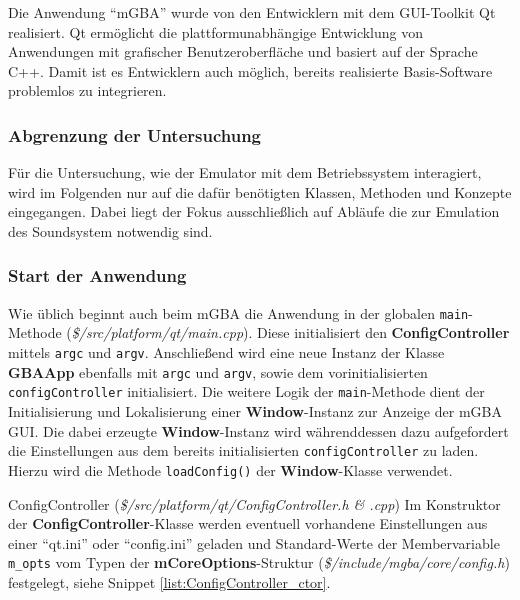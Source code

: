 \documentclass[11pt,a4paper]{scrartcl}
\begin{document}
Die Anwendung \enquote{mGBA} wurde von den Entwicklern mit dem GUI-Toolkit Qt realisiert. Qt erm\"oglicht die plattformunabh\"angige Entwicklung von Anwendungen mit grafischer Benutzeroberfl\"ache und basiert auf der Sprache C++. Damit ist es Entwicklern auch m\"oglich, bereits realisierte Basis-Software problemlos zu integrieren.

\subsubsection{Abgrenzung der Untersuchung}

F\"ur die Untersuchung, wie der Emulator mit dem Betriebssystem interagiert, wird im Folgenden nur auf die daf\"ur ben\"otigten Klassen, Methoden und Konzepte eingegangen. Dabei liegt der Fokus ausschlie{\ss}lich auf Abl\"aufe die zur Emulation des Soundsystem notwendig sind.

\subsubsection{Start der Anwendung}

Wie \"ublich beginnt auch beim mGBA die Anwendung in der globalen \verb|main|-Methode (\textit{\$/src/platform/qt/main.cpp}). Diese initialisiert den \textbf{ConfigController} mittels \verb|argc| und \verb|argv|. Anschlie{\ss}end wird eine neue Instanz der Klasse \textbf{GBAApp} ebenfalls mit \verb|argc| und \verb|argv|, sowie dem vorinitialisierten \verb|configController| initialisiert. Die weitere Logik der \verb|main|-Methode dient der Initialisierung und Lokalisierung einer \textbf{Window}-Instanz zur Anzeige der mGBA GUI. Die dabei erzeugte \textbf{Window}-Instanz wird w\"ahrenddessen dazu aufgefordert die Einstellungen aus dem bereits initialisierten \verb|configController| zu laden. Hierzu wird die Methode \verb|loadConfig()| der \textbf{Window}-Klasse verwendet.

\vspace{5mm}
\large ConfigController \normalsize(\textit{\$/src/platform/qt/ConfigController.h \& .cpp})
\vspace{2mm}\newline
Im Konstruktor der \textbf{ConfigController}-Klasse werden eventuell vorhandene Einstellungen aus einer \enquote{qt.ini} oder \enquote{config.ini} geladen und Standard-Werte der Membervariable \verb|m_opts| vom Typen der \textbf{mCoreOptions}-Struktur (\textit{\$/include/mgba/core/config.h}) festgelegt, siehe Snippet \ref{list:ConfigController_ctor}.
\end{document}
